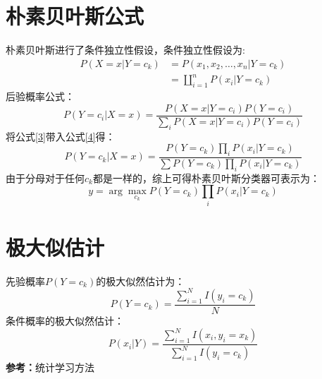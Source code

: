 \documentclass{report}
\begin{document}
	\section{朴素贝叶斯公式}
	朴素贝叶斯进行了条件独立性假设，条件独立性假设为:
	\begin{align}
	P\left (X=x| Y=c_{k}\right ) &= P\left ( x_{1},x_{2},\ldots,x_{n}|Y=c_{k} \right )\\
	&= \coprod_{i=1}^{n}P\left (x_{i} |Y=c_{k}\right )
	\label{3}
	\end{align}
	后验概率公式：
	\begin{equation}
	P\left ( Y=c_{i}|X=x \right )=\frac{P\left ( X=x|Y=c_{i}\right )P\left ( Y=c_{i} \right ) }{\sum_{i}P\left ( X=x|Y=c_{i}\right )P\left ( Y=c_{i} \right ) }
	\label{4}
	\end{equation}
	将公式\ref{3}带入公式\ref{4}得：
	\begin{equation}
	P\left ( Y=c_{k}|X=x \right )=\frac{P\left ( Y=c_{k}\right ) \prod_{i}P\left ( x_{i}|Y=c_{k} \right )}{\sum P\left ( Y=c_{k}\right )\prod_{i}P\left ( x_{i}|Y=c_{k} \right ) }
	\end{equation}
	由于分母对于任何$c_{k}$都是一样的，综上可得朴素贝叶斯分类器可表示为：
	\begin{equation}
	y=\arg \mathop{max}_{c_{k}}P\left ( Y=c_{k}\right ) \prod_{i}P\left ( x_{i}|Y=c_{k} \right )
	\end{equation}
	\section{极大似估计}
	先验概率$P(Y=c_{k})$的极大似然估计为：
	\begin{equation}
	P\left ( Y=c_{k} \right )=\frac{\sum_{i=1}^{N}I\left ( y_{i}=c_{k} \right )}{N}
	\end{equation}
	条件概率的极大似然估计：
	\begin{equation}
	P\left ( x_{i}|Y \right ) =\frac{\sum_{i=1}^{N}I\left ( x_{i},y_{i} = x_{k}\right )}{\sum_{i=1}^{N}I\left ( y_{i}=c_{k} \right )}
	\end{equation}
	\textbf{参考：}统计学习方法
\end{document}
